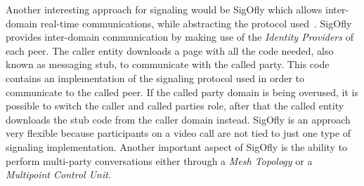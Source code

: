   Another interesting approach for signaling would be \ac{SigOfly} which allows inter-domain real-time communications, while abstracting the protocol used~\cite{sigofly}.
  \ac{SigOfly} provides inter-domain communication by making use of the \emph{Identity Providers} of each peer. 
  The caller entity downloads a page with all the code needed, also known as messaging stub, to communicate with the called party.
  This code contains an implementation of the signaling protocol used in order to communicate to the called peer. If the called party domain is being overused, it is possible to switch the caller and called parties role, after that the called entity downloads the stub code from the caller domain instead.
  \ac{SigOfly} is an approach very flexible because participants on a video call are not tied to just one type of signaling implementation. Another important aspect of \ac{SigOfly} is the ability to perform multi-party conversations either through a \emph{Mesh Topology} or a \emph{Multipoint Control Unit}.
